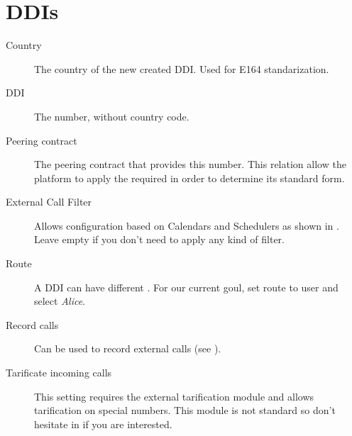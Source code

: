 \documentclass[letterpaper,10pt,english]{sphinxmanual}
\begin{document}
\section{DDIs}
\label{company/ddis:ddis}\label{company/ddis::doc}\begin{description}
\item[{Country}] \leavevmode{}\label{company/ddis:term-country}
The country of the new created DDI. Used for E164 standarization.

\item[{DDI}] \leavevmode{}\label{company/ddis:term-ddi}
The number, without country code.

\item[{Peering contract}] \leavevmode{}\label{company/ddis:term-peering-contract}
The peering contract that provides this number. This relation allow
the platform to apply the required {\hyperref[brand/transformations/index:transformations]{}} in
order to determine its standard form.

\item[{External Call Filter}] \leavevmode{}\label{company/ddis:term-external-call-filter}
Allows configuration based on Calendars and Schedulers as shown in
{\hyperref[company/external_filters:external\string-call\string-filters]{}}. Leave empty if you don't need to apply any
kind of filter.

\item[{Route}] \leavevmode{}\label{company/ddis:term-route}
A DDI can have different {\hyperref[company/ddis:routing\string-logics]{}}. For our
current goul, set route to user and select \emph{Alice}.

\item[{Record calls}] \leavevmode{}\label{company/ddis:term-record-calls}
Can be used to record external calls (see {\hyperref[company/call_recording:call\string-recordings]{}}).

\item[{Tarificate incoming calls}] \leavevmode{}\label{company/ddis:term-tarificate-incoming-calls}
This setting requires the external tarification module and allows
tarification on special numbers. This module is not standard so don't
hesitate in {\hyperref[basics/intro/getting_help:getting\string-help]{}} if you are interested.

\end{description}
\end{document}
